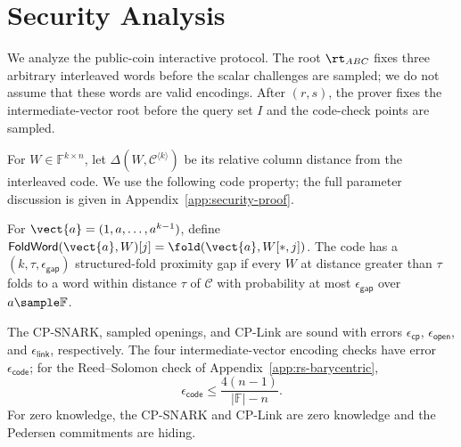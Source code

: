 \section{Security Analysis}
\label{sec:security}

We analyze the public-coin interactive protocol.  The root \(\rt_{ABC}\)
fixes three arbitrary interleaved words before the scalar challenges are
sampled; we do not assume that these words are valid encodings.  After
\((r,s)\), the prover fixes the intermediate-vector root before the query set
\(I\) and the code-check points are sampled.

For \(W\in\mathbb{F}^{k\times n}\), let
\(\Delta(W,\mathcal{C}^{\langle k\rangle})\) be its relative column distance
from the interleaved code.  We use the following code property; the full
parameter discussion is given in Appendix~\ref{app:security-proof}.

\begin{definition}
\label{def:structured-proximity-gap}
For \(\vect{a}=(1,a,\ldots,a^{k-1})\), define
\(\mathsf{FoldWord}(\vect{a},W)[j]=\fold(\vect{a},W[*,j])\).  The code has a
\((k,\tau,\epsilon_{\mathsf{gap}})\) structured-fold proximity gap if every
\(W\) at distance greater than \(\tau\) folds to a word within distance
\(\tau\) of \(\mathcal{C}\) with probability at most
\(\epsilon_{\mathsf{gap}}\) over \(a\sample\mathbb{F}\).
\end{definition}

\begin{definition}
\label{def:lamp-backend-assumptions}
The CP-SNARK, sampled openings, and CP-Link are sound with errors
\(\epsilon_{\mathsf{cp}}\), \(\epsilon_{\mathsf{open}}\), and
\(\epsilon_{\mathsf{link}}\), respectively.  The four intermediate-vector
encoding checks have error \(\epsilon_{\mathsf{code}}\); for the
Reed--Solomon check of Appendix~\ref{app:rs-barycentric},
\[
  \epsilon_{\mathsf{code}}
  \le \frac{4(n-1)}{|\mathbb{F}|-n}.
\]
For zero knowledge, the CP-SNARK and CP-Link are zero knowledge and the
Pedersen commitments are hiding.
\end{definition}

